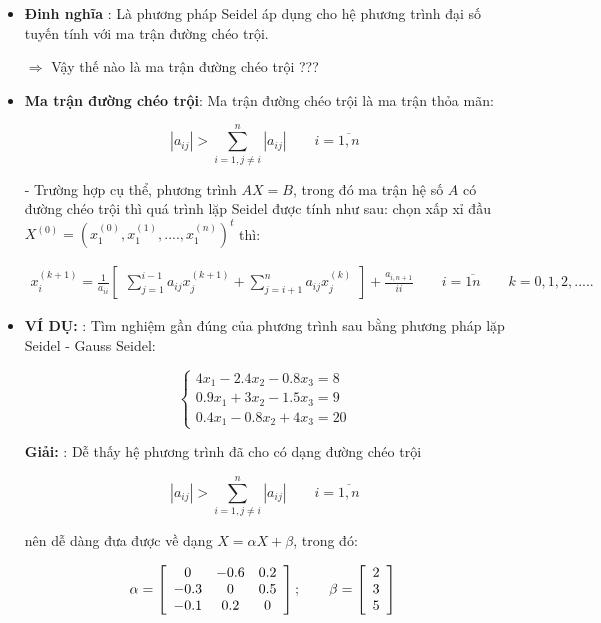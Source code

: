 \documentclass[12pt,a4paper]{article}
\begin{document}
\begin{itemize}
\item{ \textbf{Đinh nghĩa }}: Là phương pháp Seidel áp dụng cho hệ phương trình đại số tuyến tính với {\color{red}ma trận đường chéo trội}.

$ \Rightarrow$ Vậy thế nào là ma trận đường chéo trội ???

\item{ \textbf{Ma trận đường chéo trội}}: {\color{red}Ma trận đường chéo trội} là ma trận thỏa mãn:

$$ |a_{ij}| > \sum\limits_{i = 1, j \neq i}^n {{|a_{ij}|}} \qquad i = \overline{1,n}$$

- Trường hợp cụ thể, phương trình $AX = B$, trong đó ma trận hệ số $A$ có đường chéo trội thì quá trình lặp Seidel được tính như sau: chọn xấp xỉ đầu $X^{(0)} = (x_1^{(0)}, x_1^{(1)}, ...., x_1^{(n)})^t$ thì: 

\begin{align}
x_i^{(k + 1)} = \frac{1}{a_{ii}} {\left[ \begin{matrix} \sum\limits_{j = 1}^{i - 1} {{a_{ij}x_j^{(k + 1)}}} + \sum\limits_{j = i + 1}^n {{a_{ij}x_j^{(k)}}}  \end{matrix}\right]} + \frac{a_{i, {n + 1}}}{ii} \qquad i = \overline{1n} \qquad k = 0,1,2,.....
\end{align}

\item{\textbf{VÍ DỤ: }}: Tìm nghiệm gần đúng của phương trình sau bằng phương pháp lặp Seidel - Gauss Seidel: 

$$ \left\{\begin{matrix} 4x_1 - 2.4x_2 - 0.8x_3 = 8\\0.9x_1 + 3x_2 - 1.5x_3 = 9\\ 0.4x_1 - 0.8x_2 + 4x_3 = 20 \end{matrix} $$

\textbf{Giải: }: Dễ thấy hệ phương trình đã cho có dạng đường chéo trội 

$$ |a_{ij}| > \sum\limits_{i = 1, j \neq i}^n {{|a_{ij}|}} \qquad i = \overline{1,n}$$

nên dễ dàng đưa được về dạng $X = \alpha X + \beta$, trong đó:

$$ \alpha = \left[ {\begin{array}{*{20}{c}}
0&{ - 0.6}&{0.2}\\
{ - 0.3}&0&{0.5}\\
{ - 0.1}&{0.2}&0
\end{array}} \right]; \qquad 
\beta = \left[ {\begin{array}{*{20}{c}}
2\\
3\\
5
\end{array}} \right] \\ $$


\end{itemize}
\end{document}
